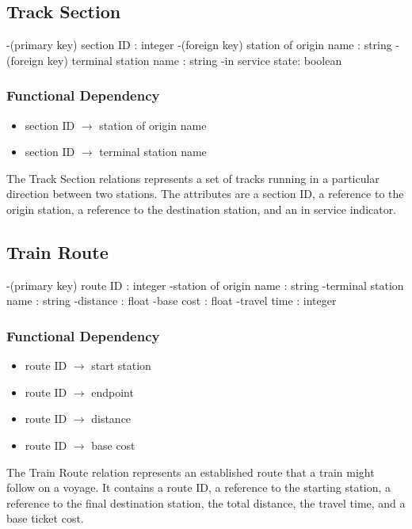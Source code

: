 \documentclass[a4paper]{article}
\begin{document}
\subsection*{Track Section}
\begin{itemize}
-(primary key) section ID : integer
-(foreign key) station of origin name : string
-(foreign key) terminal station name : string
-in service state: boolean
\end{itemize}
\subsubsection*{Functional Dependency}
\begin{itemize}
\item section ID $\rightarrow$ station of origin name 
\item section ID $\rightarrow$ terminal station name
\end{itemize}
The Track Section relations represents a set of tracks running in a particular direction between two stations. The attributes are a section ID, a reference to the origin station, a reference to the destination station, and an in service indicator.

\subsection*{Train Route}
\begin{itemize}
-(primary key) route ID : integer
-station of origin name : string
-terminal station name : string
-distance : float
-base cost : float
-travel time : integer 
\end{itemize}
\subsubsection*{Functional Dependency}
\begin{itemize}
\item route ID $\rightarrow$ start station
\item route ID $\rightarrow$ endpoint
\item route ID $\rightarrow$ distance
\item route ID $\rightarrow$ base cost
\end{itemize}
The Train Route relation represents an established route that a train might follow on a voyage. It contains a route ID, a reference to the starting station, a reference to the final destination station, the total distance, the travel time, and a base ticket cost.
\end{document}
